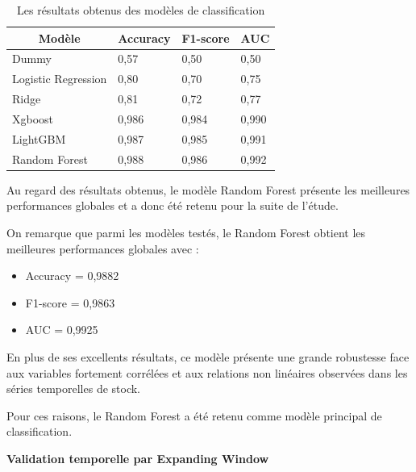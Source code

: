 \begin{table}[H]
\centering
\caption{Les résultats obtenus des modèles de classification}
\label{tab:ch4:resultats_classification}
\small
\begin{tabular}{|p{3.5cm}|p{3cm}|p{3cm}|p{3cm}|}
\hline
\multicolumn{1}{|c|}{\textbf{Modèle}} & 
\multicolumn{1}{c|}{\textbf{Accuracy}} & 
\multicolumn{1}{c|}{\textbf{F1-score}} & 
\multicolumn{1}{c|}{\textbf{AUC}} \\
\hline
Dummy & 0,57 & 0,50 & 0,50 \\
\hline
Logistic Regression & 0,80 & 0,70 & 0,75 \\
\hline
Ridge & 0,81 & 0,72 & 0,77 \\
\hline
Xgboost & 0,986 & 0,984 & 0,990 \\
\hline
LightGBM & 0,987 & 0,985 & 0,991 \\
\hline
Random Forest & 0,988 & 0,986 & 0,992 \\
\hline
\end{tabular}
\end{table}
 
Au regard des résultats obtenus, le modèle Random Forest présente les meilleures performances globales et a donc été retenu pour la suite de l'étude.
 
On remarque que parmi les modèles testés, le Random Forest obtient les meilleures performances globales avec :
 
\begin{itemize}
    \item Accuracy = 0,9882
    \item F1-score = 0,9863
    \item AUC = 0,9925
\end{itemize}
 
En plus de ses excellents résultats, ce modèle présente une grande robustesse face aux variables fortement corrélées et aux relations non linéaires observées dans les séries temporelles de stock.
 
Pour ces raisons, le Random Forest a été retenu comme modèle principal de classification.
 
\textbf{Validation temporelle par Expanding Window}
 
